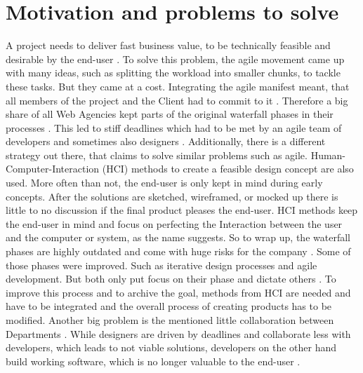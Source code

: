 \section*{Motivation and problems to solve}

A project needs to deliver fast business value, to be technically feasible and desirable by the end-user \citep{ratcliffe2011agile:11}. \newline
To solve this problem, the agile movement came up with many ideas, such as splitting the workload into smaller chunks, to tackle these tasks. But they came at a cost. Integrating the agile manifest meant, that all members of the project and the Client had to commit to it \citep{ratcliffe2011agile:11}. Therefore a big share of all Web Agencies kept parts of the original waterfall phases in their processes \citep{10spanne26:online}. This led to stiff deadlines which had to be met by an agile team of developers and sometimes also designers \citep{ratcliffe2011agile:4}. \newline
Additionally, there is a different strategy out there, that claims to solve similar problems such as agile. Human-Computer-Interaction (HCI) methods to create a feasible design concept are also used. \newline
More often than not, the end-user is only kept in mind during early concepts. After the solutions are sketched, wireframed, or mocked up there is little to no discussion if the final product pleases the end-user. HCI methods keep the end-user in mind and focus on perfecting the Interaction between the user and the computer or system, as the name suggests. \newline
So to wrap up, the waterfall phases are highly outdated and come with huge risks for the company \citep{ratcliffe2011agile:14}. Some of those phases were improved. Such as iterative design processes and agile development. But both only put focus on their phase and dictate others \citep{ratcliffe2011agile:22}. To improve this process and to archive the goal, methods from HCI are needed and have to be integrated and the overall process of creating products has to be modified. \newline
Another big problem is the mentioned little collaboration between Departments \citep{ratcliffe2011agile:fw}. While designers are driven by deadlines and collaborate less with developers, which leads to not viable solutions, developers on the other hand build working software, which is no longer valuable to the end-user \citep{ratcliffe2011agile:19,ratcliffe2011agile:33}. \newline
